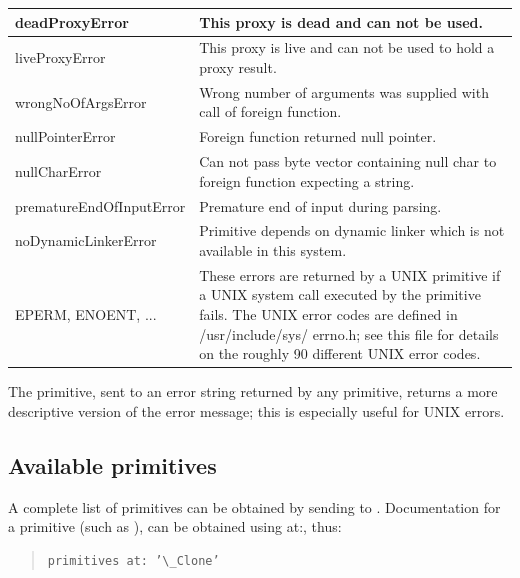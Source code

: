 \documentclass[letterpaper,10pt,english]{sphinxmanual}
\begin{document}
\begin{longtable}{p{5cm} p{10cm}}
deadProxyError
 & 
This proxy is dead and can not be used.
\\\hline

liveProxyError
 & 
This proxy is live and can not be used to hold a proxy result.
\\\hline

wrongNoOfArgsError
 & 
Wrong number of arguments was supplied with call of foreign function.
\\\hline

nullPointerError
 & 
Foreign function returned null pointer.
\\\hline

nullCharError
 & 
Can not pass byte vector containing null char to foreign function expecting a string.
\\\hline

prematureEndOfInputError
 & 
Premature end of input during parsing.
\\\hline

noDynamicLinkerError
 & 
Primitive depends on dynamic linker which is not available in this system.
\\\hline

EPERM, ENOENT, ...
 & 
These errors are returned by a UNIX primitive if a UNIX system call executed by the
primitive fails. The UNIX error codes are defined in /usr/include/sys/ errno.h;
see this file for details on the roughly 90 different UNIX error codes.
\\\hline
\end{longtable}


The  primitive, sent to an error string returned by any primitive, returns a more
descriptive version of the error message; this is especially useful for UNIX errors.


\subsection{Available primitives}
\label{primitives:available-primitives}
A complete list of primitives can be obtained by sending  to . Documentation
for a primitive (such as ), can be obtained using at:, thus:
\begin{quote}

\begin{Verbatim}[commandchars=\\\{\}]
primitives at: ’\_Clone’
\end{Verbatim}
\end{quote}
\end{document}

